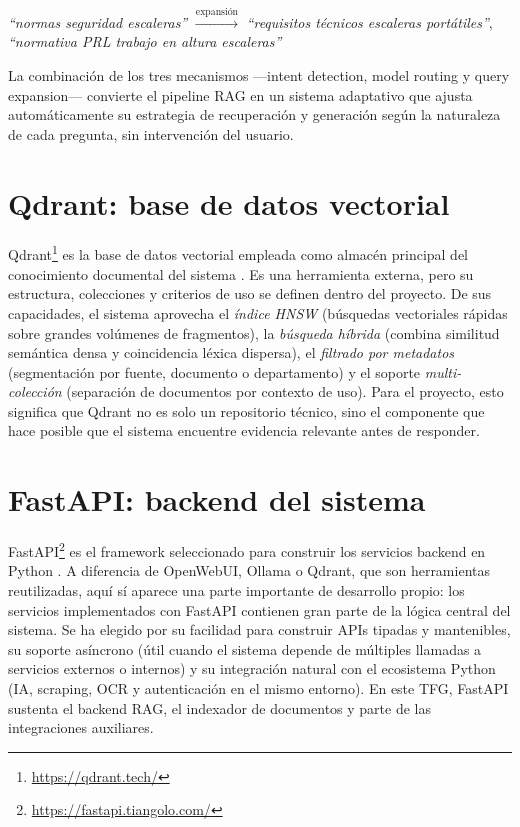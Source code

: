 \begin{center}
\textit{``normas seguridad escaleras''} $\xrightarrow{\text{expansión}}$
\textit{``requisitos técnicos escaleras portátiles''},
\textit{``normativa PRL trabajo en altura escaleras''}
\end{center}

La combinación de los tres mecanismos ---intent detection, model routing y query expansion--- convierte el pipeline RAG en un sistema adaptativo que ajusta automáticamente su estrategia de recuperación y generación según la naturaleza de cada pregunta, sin intervención del usuario.

\section{Qdrant: base de datos vectorial}
\label{sec:qdrant}

Qdrant\footnote{\url{https://qdrant.tech/}} es la base de datos vectorial empleada como almacén principal del conocimiento documental del sistema \cite{qdrant2024docs}. Es una herramienta externa, pero su estructura, colecciones y criterios de uso se definen dentro del proyecto. De sus capacidades, el sistema aprovecha el \textit{índice HNSW} (búsquedas vectoriales rápidas sobre grandes volúmenes de fragmentos), la \textit{búsqueda híbrida} (combina similitud semántica densa y coincidencia léxica dispersa), el \textit{filtrado por metadatos} (segmentación por fuente, documento o departamento) y el soporte \textit{multi-colección} (separación de documentos por contexto de uso). Para el proyecto, esto significa que Qdrant no es solo un repositorio técnico, sino el componente que hace posible que el sistema encuentre evidencia relevante antes de responder.

\section{FastAPI: backend del sistema}
\label{sec:fastapi}

FastAPI\footnote{\url{https://fastapi.tiangolo.com/}} es el framework seleccionado para construir los servicios backend en Python \cite{fastapi2024docs}. A diferencia de OpenWebUI, Ollama o Qdrant, que son herramientas reutilizadas, aquí sí aparece una parte importante de desarrollo propio: los servicios implementados con FastAPI contienen gran parte de la lógica central del sistema. Se ha elegido por su facilidad para construir APIs tipadas y mantenibles, su soporte asíncrono (útil cuando el sistema depende de múltiples llamadas a servicios externos o internos) y su integración natural con el ecosistema Python (IA, scraping, OCR y autenticación en el mismo entorno). En este TFG, FastAPI sustenta el backend RAG, el indexador de documentos y parte de las integraciones auxiliares.

